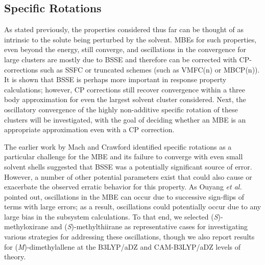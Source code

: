 \subsection{Specific Rotations}

As stated previously, the properties considered thus far can be thought of as intrinsic to
the solute being perturbed by the solvent. MBEs for such properties, even beyond the energy,
still converge, and oscillations in the convergence for large clusters are mostly due to
BSSE and therefore can be corrected with CP-corrections such as SSFC or truncated schemes (such as VMFC(n)\cite{Kamiya2008} or MBCP(n)\cite{Richard2013}). It is shown that BSSE is perhaps more important in response property calculations; however, CP corrections still recover convergence within a three body approximation for even the largest solvent cluster considered. Next, the oscillatory convergence of the highly non-additive specific rotation of these clusters will be investigated, with the goal of deciding whether an MBE is an appropriate approximation even with a CP correction. 

The earlier work by Mach and Crawford\cite{Mach2014} identified specific rotations as a particular challenge for the MBE and its failure to converge with even small solvent shells suggested that BSSE was a potentially significant source of error. However, a number of other potential parameters exist that could also cause or exacerbate the observed erratic behavior for this property.  As Ouyang \textit{et al.} pointed out\cite{Ouyang2014}, oscillations in the MBE can occur due to successive sign-flips of terms with large errors; as a result, oscillations could potentially occur due to any large bias in the subsystem calculations. To that end, we selected (\textit{S})-methyloxirane and (\textit{S})-methylthiirane as representative cases for investigating various strategies for addressing these oscillations, though we also report results for (\textit{M})-dimethylallene at the B3LYP/aDZ and CAM-B3LYP/aDZ levels of theory.

